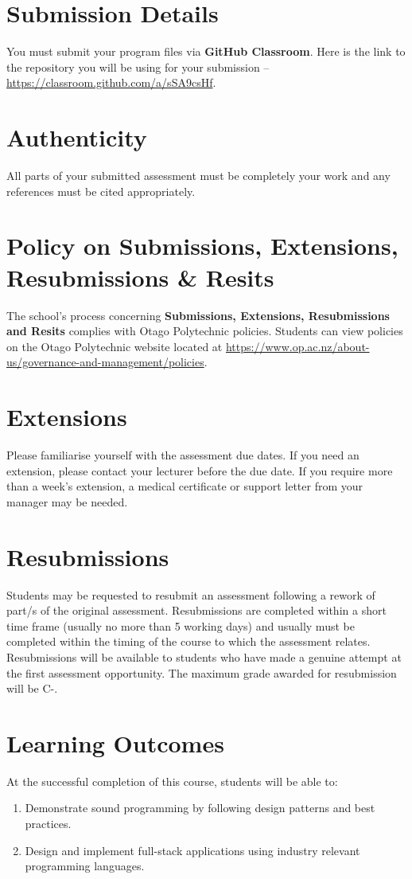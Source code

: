 \documentclass{article}
\begin{document}
\section*{Submission Details}
You must submit your program files via \textbf{GitHub Classroom}. Here is the link to the repository you will be using for your submission – \href{https://classroom.github.com/a/sSA9csHf}{https://classroom.github.com/a/sSA9csHf}.

\section*{Authenticity}
All parts of your submitted assessment must be completely your work and any references must be cited appropriately.

\section*{Policy on Submissions, Extensions, Resubmissions \& Resits}
The school's process concerning \textbf{Submissions, Extensions, Resubmissions and Resits} complies with Otago Polytechnic policies. Students can view policies on the Otago Polytechnic website located at \href{https://www.op.ac.nz/about-us/governance-and-management/policies}{https://www.op.ac.nz/about-us/governance-and-management/policies}.

\section*{Extensions}
Please familiarise yourself with the assessment due dates. If you need an extension, please contact your lecturer before the due date. If you require more than a week's extension, a medical certificate or support letter from your manager may be needed.

\section*{Resubmissions}
Students may be requested to resubmit an assessment following a rework of part/s of the original assessment. Resubmissions are completed within a short time frame (usually no more than 5 working days) and usually must be completed within the timing of the course to which the assessment relates. Resubmissions will be available to students who have made a genuine attempt at the first assessment opportunity. The maximum grade awarded for resubmission will be C-.

\section*{Learning Outcomes}
At the successful completion of this course, students will be able to:
\begin{enumerate}
	\item Demonstrate sound programming by following design patterns and best practices.
	\item Design and implement full-stack applications using industry relevant programming languages.
\end{enumerate}
\end{document}
